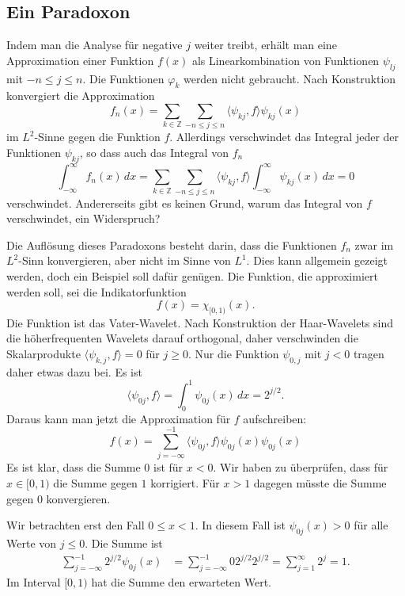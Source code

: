 \subsection{Ein Paradoxon}
Indem man die Analyse für negative $j$ weiter treibt, erhält man
eine Approximation einer Funktion $f(x)$ als Linearkombination von
Funktionen $\psi_{lj}$ mit $-n\le j\le n$.
Die Funktionen $\varphi_k$ werden nicht gebraucht.
Nach Konstruktion konvergiert die Approximation
\[
f_n(x)
=
\sum_{k\in\mathbb Z}\sum_{-n\le j\le n} \langle\psi_{kj},f\rangle \psi_{kj}(x)
\]
im $L^2$-Sinne gegen die Funktion $f$.
Allerdings verschwindet das Integral jeder der Funktionen $\psi_{kj}$,
so dass auch das Integral von $f_n$
\[
\int_{-\infty}^\infty f_n(x)\,dx
=
\sum_{k\in\mathbb Z}\sum_{-n\le j\le n} \langle\psi_{kj},f\rangle
\int_{-\infty}^\infty \psi_{kj}(x)\,dx
=
0
\]
verschwindet.
Andererseits gibt es keinen Grund, warum das Integral von $f$ verschwindet,
ein Widerspruch?

Die Auflösung dieses Paradoxons besteht darin, dass die Funktionen
$f_n$ zwar im $L^2$-Sinn konvergieren, aber nicht im Sinne von $L^1$.
Dies kann allgemein gezeigt werden, doch ein Beispiel soll dafür genügen.
Die Funktion, die approximiert werden soll, sei die Indikatorfunktion
\[
f(x) = \chi_{[0,1)}(x).
\]
Die Funktion ist das Vater-Wavelet.
Nach Konstruktion der Haar-Wavelets sind die höherfrequenten Wavelets
darauf orthogonal, daher verschwinden die Skalarprodukte
$\langle \psi_{k,j},f\rangle=0$ für $j\ge 0$.
Nur die Funktion $\psi_{0,j}$ mit $j<0$ tragen daher etwas dazu bei.
Es ist
\[
\langle \psi_{0j},f\rangle
=
\int_0^1 \psi_{0j}(x)\,dx
=
2^{j/2}.
\]
Daraus kann man jetzt die Approximation für $f$ aufschreiben:
\[
f(x)
=
\sum_{j=-\infty}^{-1} \langle \psi_{0j},f\rangle \psi_{0j}(x)
\psi_{0j}(x)
\]
Es ist klar, dass die Summe $0$ ist für $x<0$.
Wir haben zu überprüfen, dass für $x\in[0,1)$ die Summe gegen $1$ 
korrigiert. 
Für $x>1$ dagegen müsste die Summe gegen $0$ konvergieren.

Wir betrachten erst den Fall $0\le x < 1$.
In diesem Fall ist $\psi_{0j}(x)>0$ für alle Werte von $j\le 0$.
Die Summe ist
\begin{align*}
\sum_{j=-\infty}^{-1} 2^{j/2} \psi_{0j}(x)
&=
\sum_{j=-\infty}^{-1}0 2^{j/2} 2^{j/2}
=
\sum_{j=1}^\infty 2^j = 1.
\end{align*}
Im Interval $[0,1)$ hat die Summe den erwarteten Wert.

